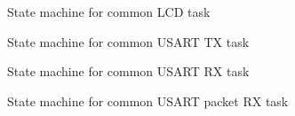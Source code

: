 \documentclass{article}
\begin{document}
\begin{figure}[H]
  \centering
  \caption{State machine for common LCD task}
  
  \label{sm:9}
\end{figure}

\begin{figure}[H]
  \centering
  \caption{State machine for common USART TX task}
  
  \label{sm:10}
\end{figure}

\begin{figure}[H]
  \centering
  \caption{State machine for common USART RX task}
  
  \label{sm:11}
\end{figure}

\begin{figure}[H]
  \centering
  \caption{State machine for common USART packet RX task}
  
  \label{sm:12}
\end{figure}
\end{document}
